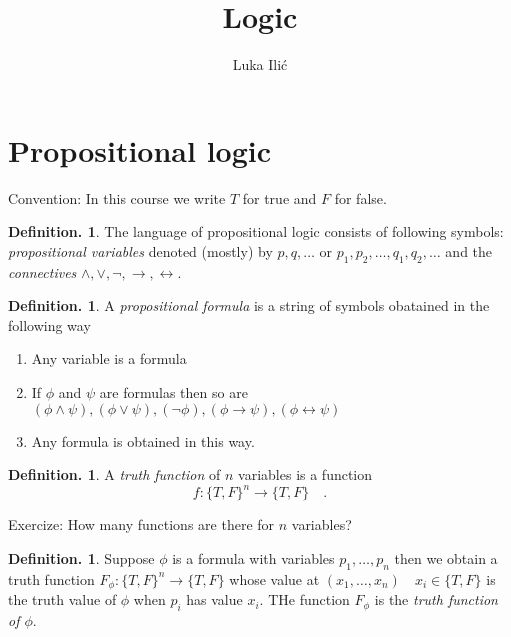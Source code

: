 \documentclass[a4paper,oneside,11pt,DIV=12,parskip=half]{scrartcl}
\title{Logic}
\author{ Luka Ili\'{c}}
\theoremstyle{plain}
\theoremstyle{definition}
\newtheorem{definition}[theorem]{Definition.}
\newtheorem{remark, definition}[theorem]{Bemerkung und Definition.}
\newtheorem{lemma, definition}[theorem]{Lemma und Definition.}
\newtheorem{theorem, definition}[theorem]{Satz und Definition.}
\theoremstyle{remark}
\newtheorem*{remark, example}{\textbf{Bemerkung und Beispiel}}
\begin{document}
\maketitle

\pagebreak

\tableofcontents

\pagebreak

\section{Propositional logic}

Convention: In this course we write $T$ for true and $F$ for false.

\begin{definition}
	The language of propositional logic consists of following symbols:
 \emph{propositional variables} denoted (mostly) by $ p,q, \dots $ or 	$p_1,p_2,\dots, q_1, q_2, \dots$
	and the \emph{connectives} $\land, \lor, \lnot, \rightarrow, \leftrightarrow$.
\end{definition}

\begin{definition}
	A \emph{propositional formula} is a string of symbols obatained in the following way
\begin{enumerate}
\item Any variable is a formula \\
\item If $\phi $ and $\psi$ are formulas then so are
$(\phi \land \psi),(\phi \lor \psi), (\lnot \phi), (\phi \rightarrow \psi), (\phi \leftrightarrow \psi)$
\item Any formula is obtained in this way.
\end{enumerate}
\end{definition}

\begin{definition}
A \emph{truth function} of $n$ variables is a function 
	\[ f: \{ T,F \}^n \rightarrow \{ T,F \} \quad. \]
\end{definition}

Exercize: How many functions are there for $n$ variables?

\begin{definition}
Suppose $\phi$ is a formula with variables $p_1, \dots, p_n$ then we obtain a truth function $F_{\phi}: \{T,F\}^n \rightarrow \{T,F\}$ whose value at $(x_1, \dots, x_n) \quad x_i \in \{T,F\} $ is the truth value of $\phi$ when $p_i$ has value $x_i$. THe function $F_{\phi}$ is the \emph{truth function of $\phi$}.
\end{definition}
\end{document}
